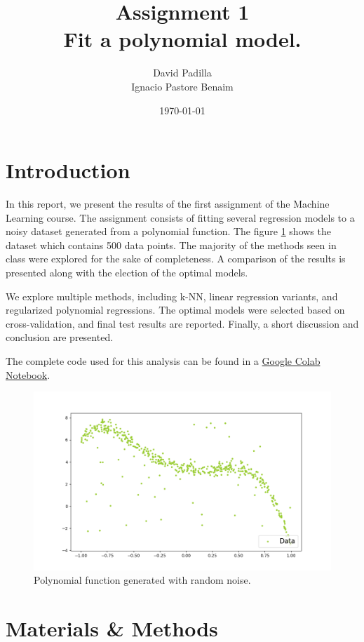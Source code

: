 \documentclass[twocolumn]{article}
\title{Assignment 1 \\ \small Fit a polynomial model.}
\author{David Padilla \\ Ignacio Pastore Benaim}
\date{\today}   %
\begin{document}
\maketitle

\section{Introduction}

In this report, we present the results of the first assignment of the Machine Learning course. The assignment consists of fitting 
several regression models to a noisy dataset generated from a polynomial function. The figure \ref{fig:polynomial_data} shows 
the dataset which contains 500 data points. The majority of the methods seen in class were explored for the sake 
of completeness. A comparison of the results is presented along with the election of the optimal models. 

We explore multiple methods, including k-NN, linear regression variants, and regularized 
polynomial regressions. The optimal models were selected based on cross-validation, 
and final test results are reported. Finally, a short discussion and conclusion are presented.

The complete code used for this analysis can be found in a \href{https://colab.research.google.com/drive/1Gg35b8epwsI3nkCeiqCgBeFCd3aNdahI?usp=sharing}{Google Colab Notebook}.

\begin{figure}[!htb]
\centering
\includegraphics[width=0.95\columnwidth]{images/scatter_plot.png}
\caption{Polynomial function generated with random noise.}
\label{fig:polynomial_data}
\end{figure}
  
\section{Materials \& Methods}
\end{document}
